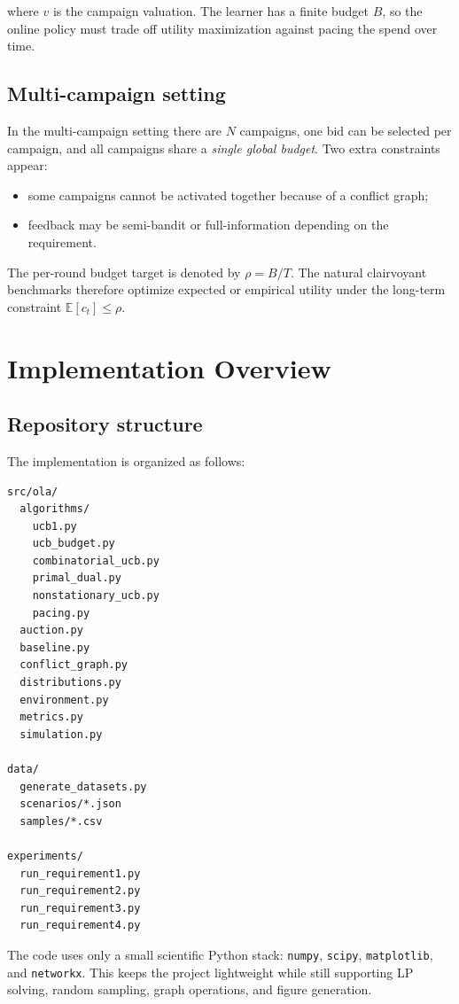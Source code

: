 \documentclass[11pt,a4paper]{article}
\begin{document}
where $v$ is the campaign valuation. The learner has a finite budget $B$, so the
online policy must trade off utility maximization against pacing the spend over
time.

\subsection{Multi-campaign setting}

In the multi-campaign setting there are $N$ campaigns, one bid can be selected
per campaign, and all campaigns share a \emph{single global budget}. Two extra
constraints appear:

\begin{itemize}
  \item some campaigns cannot be activated together because of a conflict graph;
  \item feedback may be semi-bandit or full-information depending on the
  requirement.
\end{itemize}

The per-round budget target is denoted by $\rho = B/T$. The natural clairvoyant
benchmarks therefore optimize expected or empirical utility under the long-term
constraint $\mathbb{E}[c_t] \le \rho$.

\section{Implementation Overview}

\subsection{Repository structure}

The implementation is organized as follows:

\begin{verbatim}
src/ola/
  algorithms/
    ucb1.py
    ucb_budget.py
    combinatorial_ucb.py
    primal_dual.py
    nonstationary_ucb.py
    pacing.py
  auction.py
  baseline.py
  conflict_graph.py
  distributions.py
  environment.py
  metrics.py
  simulation.py

data/
  generate_datasets.py
  scenarios/*.json
  samples/*.csv

experiments/
  run_requirement1.py
  run_requirement2.py
  run_requirement3.py
  run_requirement4.py
\end{verbatim}

The code uses only a small scientific Python stack: \texttt{numpy},
\texttt{scipy}, \texttt{matplotlib}, and \texttt{networkx}. This keeps the
project lightweight while still supporting LP solving, random sampling, graph
operations, and figure generation.
\end{document}
